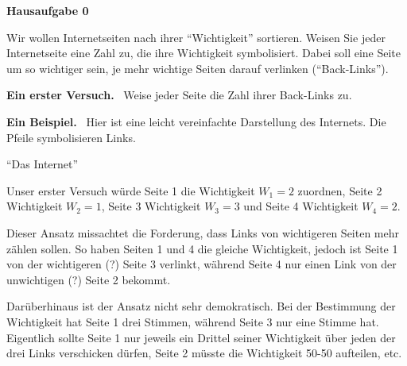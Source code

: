 \documentclass[a4,11pt]{article}
\begin{document}
\vspace*{-17mm}
{
\kopf
}

\begin{center} \Large \bfseries Hausaufgabe 0 \end{center}
\bigskip
\bigskip

Wir wollen Internetseiten nach ihrer
"`Wichtigkeit"' sortieren. Weisen Sie jeder Internetseite eine Zahl
zu, die ihre Wichtigkeit symbolisiert. Dabei soll eine Seite um so
wichtiger sein, je mehr wichtige Seiten darauf verlinken
("`Back-Links"').
\bigskip

{\bf Ein erster Versuch.} \ Weise jeder Seite die Zahl ihrer Back-Links
zu. 
\bigskip

{\bf Ein Beispiel.} \ Hier ist eine leicht vereinfachte Darstellung des
Internets. Die Pfeile symbolisieren Links.
\begin{center}
  

  "`Das Internet"'
\end{center}
Unser erster Versuch w\"urde Seite 1 die Wichtigkeit $W_1=2$ zuordnen,
Seite 2 Wichtigkeit $W_2=1$, Seite 3 Wichtigkeit $W_3=3$ und Seite 4
Wichtigkeit $W_4=2$.

Dieser Ansatz missachtet die Forderung, dass Links von wichtigeren
Seiten mehr z\"ahlen sollen. So haben Seiten 1 und 4 die gleiche
Wichtigkeit, jedoch ist Seite 1 von der wichtigeren (?) Seite 3
verlinkt, w\"ahrend Seite 4 nur einen Link von der unwichtigen (?)
Seite 2 bekommt.

Dar\"uberhinaus ist der Ansatz nicht sehr demokratisch. Bei der
Bestimmung der Wichtigkeit hat Seite 1 drei Stimmen, w\"ahrend Seite 3
nur eine Stimme hat. Eigentlich sollte Seite 1 nur jeweils ein Drittel
seiner Wichtigkeit \"uber jeden der drei Links verschicken d\"urfen,
Seite 2 m\"usste die Wichtigkeit 50-50 aufteilen, etc.
\bigskip


\end{document}
